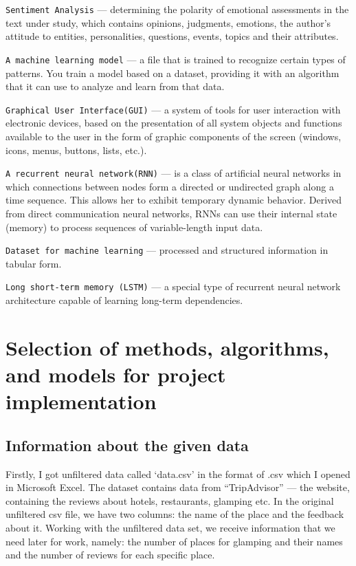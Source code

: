 \documentclass[]{article}
\begin{document}
\texttt{Sentiment Analysis}
--- determining the polarity of emotional assessments in the text under study, which contains opinions, judgments, emotions, the author's attitude to entities, personalities, questions, events, topics and their attributes.\vspace{3mm}

\texttt{A machine learning model}
--- a file that is trained to recognize certain types of patterns. You train a model based on a dataset, providing it with an algorithm that it can use to analyze and learn from that data.\vspace{3mm}

\texttt{Graphical User Interface(GUI)}
--- a system of tools for user interaction with electronic devices, based on the presentation of all system objects and functions available to the user in the form of graphic components of the screen (windows, icons, menus, buttons, lists, etc.).\vspace{3mm}

\texttt{A recurrent neural network(RNN)}
--- is a class of artificial neural networks in which connections between nodes form a directed or undirected graph along a time sequence. This allows her to exhibit temporary dynamic behavior. Derived from direct communication neural networks, RNNs can use their internal state (memory) to process sequences of variable-length input data.\vspace{3mm}

\texttt{Dataset for machine learning}
--- processed and structured information in tabular form.\vspace{3mm}

\texttt{Long short-term memory (LSTM)}
--- a special type of recurrent neural network architecture capable of learning long-term dependencies.


\section{Selection of methods, algorithms, and models for project implementation}

\subsection{Information about the given data}
Firstly, I got unfiltered data called ‘data.csv’ in the format of .csv which I opened in Microsoft Excel. The dataset contains data from “TripAdvisor” --- the website, containing the reviews about hotels, restaurants, glamping etc. 
In the original unfiltered csv file, we have two columns: the name of the place and the feedback about it. Working with the unfiltered data set, we receive information that we need later for work, namely: the number of places for glamping and their names and the number of reviews for each specific place.
\end{document}
